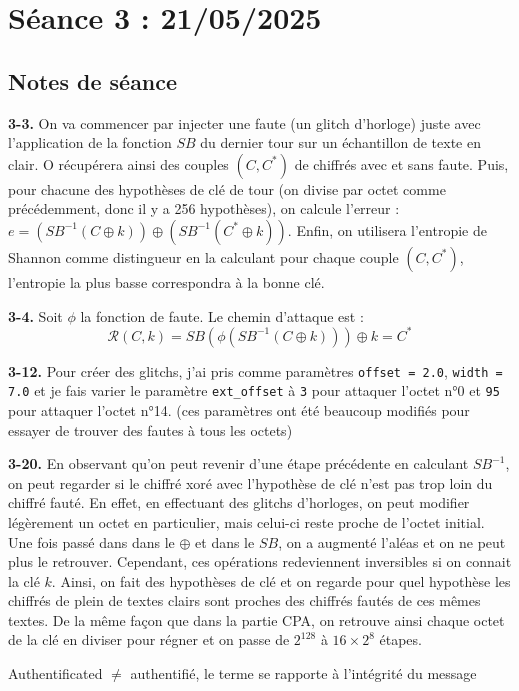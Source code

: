 \documentclass[12pt]{article}
\begin{document}
	
	\section{Séance 3 : 21/05/2025}
	\subsection{Notes de séance}
	\textbf{3-3.} On va commencer par injecter une faute (un glitch d'horloge) juste avec l'application de la fonction $SB$ du dernier tour sur un échantillon de texte en clair. O récupérera ainsi des couples $(C,C^*)$ de chiffrés avec et sans faute. Puis, pour chacune des hypothèses de clé de tour (on divise par octet comme précédemment, donc il y a 256 hypothèses), on calcule l'erreur : $e = (SB^{-1}(C \oplus k)) \oplus (SB^{-1}(C^* \oplus k))$. Enfin, on utilisera l'entropie de Shannon comme distingueur en la calculant pour chaque couple $(C,C^*)$, l'entropie la plus basse correspondra à la bonne clé.
	
	\noindent \textbf{3-4.} Soit $\phi$ la fonction de faute. Le chemin d'attaque est : $$\mathcal{R}(C,k) = SB(\phi(SB^{-1}(C \oplus k))) \oplus k = C^*$$
	
	\noindent \textbf{3-12.} Pour créer des glitchs, j'ai pris comme paramètres \verb|offset = 2.0|, \verb|width = 7.0| et je fais varier le paramètre \verb|ext_offset| à \verb|3| pour attaquer l'octet n°0 et \verb|95| pour attaquer l'octet n°14. (ces paramètres ont été beaucoup modifiés pour essayer de trouver des fautes à tous les octets)
	
	\noindent \textbf{3-20.} En observant qu'on peut revenir d'une étape précédente en calculant $SB^{-1}$, on peut regarder si le chiffré xoré avec l'hypothèse de clé n'est pas trop loin du chiffré fauté. En effet, en effectuant des glitchs d'horloges, on peut modifier légèrement un octet en particulier, mais celui-ci reste proche de l'octet initial. Une fois passé dans dans le $\oplus$ et dans le $SB$, on a augmenté l'aléas et on ne peut plus le retrouver. Cependant, ces opérations redeviennent inversibles si on connait la clé $k$. Ainsi, on fait des hypothèses de clé et on regarde pour quel hypothèse les chiffrés de plein de textes clairs sont proches des chiffrés fautés de ces mêmes textes. De la même façon que dans la partie CPA, on retrouve ainsi chaque octet de la clé en diviser pour régner et on passe de $2^{128}$ à $16 \times 2^8$ étapes.
	
	\warning Authentificated $\neq$ authentifié, le terme se rapporte à l'intégrité du message
	
\end{document}
